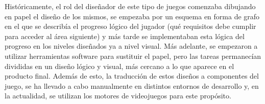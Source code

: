 Históricamente, el rol del diseñador de este tipo de juegos comenzaba dibujando en papel el diseño de los mismos, se empezaba por un esquema en forma de grafo en el que se describía el progreso lógico del jugador (qué requisitos debe cumplir para acceder al área siguiente) y más tarde se implementaban esta lógica del progreso en los niveles diseñados ya a nivel visual.
Más adelante, se empezaron a utilizar herramientas software para sustituir el papel, pero las tareas permanecían divididas en un diseño lógico y visual, más cercano a lo que aparece en el producto final.
Además de esto, la traducción de estos diseños a componentes del juego, se ha llevado a cabo manualmente en distintos entornos de desarrollo y, en la actualidad, se utilizan los motores de videojuegos para este propósito.